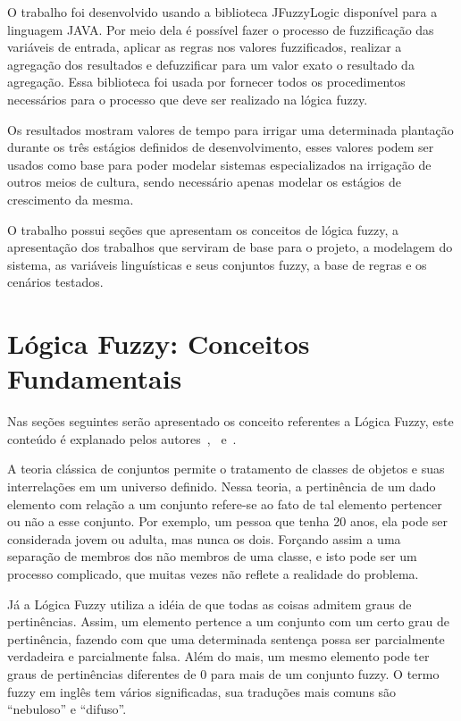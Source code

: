 \documentclass[
	article,			%
	11pt,				%
	oneside,			%
	a4paper,			%
	english,			%
	brazil,				%
	sumario=tradicional
	]{abntex2}
\begin{document}
\begin{multicols}{2}
O trabalho foi desenvolvido usando a biblioteca JFuzzyLogic disponível para a linguagem JAVA. Por meio dela é possível fazer o processo de fuzzificação das variáveis de entrada, aplicar as regras nos valores fuzzificados, realizar a agregação dos resultados e defuzzificar para um valor exato o resultado da agregação. Essa biblioteca foi usada por fornecer todos os procedimentos necessários para o processo que deve ser realizado na lógica fuzzy.

Os resultados mostram valores de tempo para irrigar uma determinada plantação durante os três estágios definidos de desenvolvimento, esses valores podem ser usados como base para poder modelar sistemas especializados na irrigação de outros meios de cultura, sendo necessário apenas modelar os estágios de crescimento da mesma.

O trabalho possui seções que apresentam os conceitos de lógica fuzzy, a apresentação dos trabalhos que serviram de base para o projeto, a modelagem do sistema, as variáveis linguísticas e seus conjuntos fuzzy, a base de regras e os cenários testados.


\section{Lógica Fuzzy: Conceitos Fundamentais}

Nas seções seguintes serão apresentado os conceito referentes a Lógica Fuzzy, este conteúdo é explanado pelos autores~\cite{mortari2001introduccao},~\cite{hung2006first} e~\cite{rezende2003sistemas}.


A teoria clássica de conjuntos permite o tratamento de classes de objetos e suas interrelações em um universo definido. Nessa teoria, a pertinência de um dado elemento com relação a um conjunto refere-se ao fato de tal elemento pertencer ou não a esse conjunto. Por exemplo, um pessoa que tenha 20 anos, ela pode ser considerada jovem ou adulta, mas nunca os dois. Forçando assim a uma separação de membros dos não membros de uma classe, e isto pode ser um processo complicado, que muitas vezes não reflete a realidade do problema.

Já a Lógica Fuzzy utiliza a idéia de que todas as coisas admitem graus de pertinências. Assim, um elemento pertence a um conjunto com um certo grau de pertinência, fazendo com que uma determinada sentença possa ser parcialmente verdadeira e parcialmente falsa. Além do mais, um mesmo elemento pode ter graus de pertinências diferentes de 0 para mais de um conjunto fuzzy. 
O termo fuzzy em inglês tem vários significadas, sua traduções mais comuns são “nebuloso” e “difuso”.


\end{multicols}
\end{document}
